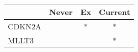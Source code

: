 \begin{tabular}{lccc}
\toprule
{} & Never & Ex & Current \\
\midrule
CDKN2A &       &  * &       * \\
MLLT3  &       &    &       * \\
\bottomrule
\end{tabular}

